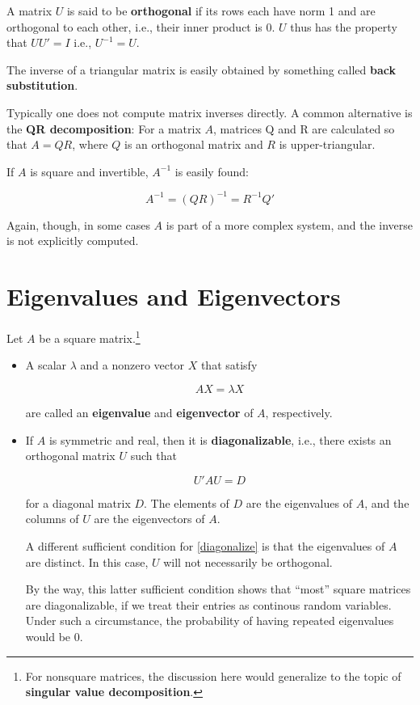 A matrix $U$ is said to be {\bf orthogonal} if its rows each have norm 1
and are orthogonal to each other, i.e., their inner product is 0.  $U$ thus
has the property that $U U' = I$ i.e., $U^{-1} = U$.

The inverse of a triangular matrix is easily obtained by something called
{\bf back substitution}.

Typically one does not compute matrix inverses directly.  A common
alternative is the {\bf QR decomposition}:  For a matrix $A$,
matrices Q and R are calculated so that $A = QR$, where $Q$ is an orthogonal
matrix and $R$ is upper-triangular.  

If $A$ is square and invertible, $A^{-1}$ is easily found: 

\begin{equation}
\label{qr}
A^{-1} = (QR)^{-1} = R^{-1} Q'
\end{equation}

Again, though, in some cases $A$ is part of a more complex system, and the
inverse is not explicitly computed.

\section{Eigenvalues and Eigenvectors}

Let $A$ be a square matrix.\footnote{For nonsquare matrices, the
discussion here would generalize to the topic of {\bf singular value
decomposition}.}  

\begin{itemize}

\item A scalar $\lambda$ and a nonzero vector $X$ that satisfy

\begin{equation}
AX = \lambda X
\end{equation}

are called an {\bf eigenvalue} and {\bf eigenvector} of $A$, respectively.

\item If $A$ is symmetric and real, then it is {\bf diagonalizable},
i.e., there exists an orthogonal matrix $U$ such that

\begin{equation}
\label{diagonalize}
U'AU = D
\end{equation}

for a diagonal matrix $D$.  The elements of $D$ are the eigenvalues of
$A$, and the columns of $U$ are the eigenvectors of $A$.

A different sufficient condition for \ref{diagonalize} is that the
eigenvalues of $A$ are distinct.  In this case, $U$ will not necessarily
be orthogonal.

By the way, this latter sufficient condition shows that ``most'' square
matrices are diagonalizable, if we treat their entries as continous
random variables.  Under such a circumstance, the probability of having
repeated eigenvalues would be 0.

\end{itemize}

